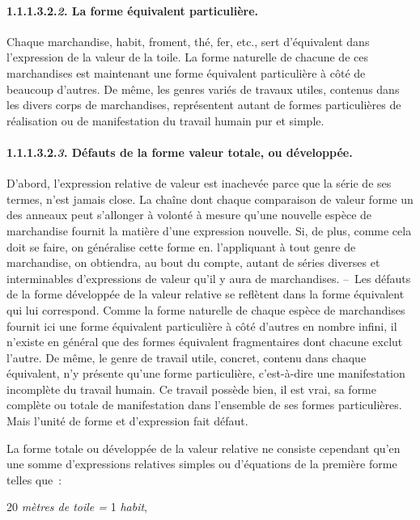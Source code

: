 \documentclass[french,twoside]{book} %
\begin{document}
\paragraph[{1.1.1.3.2.2. La forme équivalent particulière.}]{1.1.1.3.2.\emph{2}. La forme équivalent particulière.}
\noindent Chaque marchandise, habit, froment, thé, fer, etc., sert d’équivalent dans l’expression de la valeur de la toile. La forme naturelle de chacune de ces marchandises est maintenant une forme équivalent particulière à côté de beaucoup d’autres. De même, les genres variés de travaux utiles, contenus dans les divers corps de marchandises, représentent autant de formes particulières de réalisation ou de manifestation du travail humain pur et simple.
\paragraph[{1.1.1.3.2.3. Défauts de la forme valeur totale, ou développée.}]{1.1.1.3.2.\emph{3}. Défauts de la forme valeur totale, ou développée.}
\noindent D’abord, l’expression relative de valeur est inachevée parce que la série de ses termes, n’est jamais close. La chaîne dont chaque comparaison de valeur forme un des anneaux peut s’allonger à volonté à mesure qu’une nouvelle espèce de marchandise fournit la matière d’une expression nouvelle. Si, de plus, comme cela doit se faire, on généralise cette forme en. l’appliquant à tout genre de marchandise, on obtiendra, au bout du compte, autant de séries diverses et interminables d’expressions de valeur qu’il y aura de marchandises. – Les défauts de la forme développée de la valeur relative se reflètent dans la forme équivalent qui lui correspond. Comme la forme naturelle de chaque espèce de marchandises fournit ici une forme équivalent particulière à côté d’autres en nombre infini, il n’existe en général que des formes équivalent fragmentaires dont chacune exclut l’autre. De même, le genre de travail utile, concret, contenu dans chaque équivalent, n’y présente qu’une forme particulière, c’est-à-dire une manifestation incomplète du travail humain. Ce travail possède bien, il est vrai, sa forme complète ou totale de manifestation dans l’ensemble de ses formes particulières. Mais l’unité de forme et d’expression fait défaut.\par
La forme totale ou développée de la valeur relative ne consiste cependant qu’en une somme d’expressions relatives simples ou d’équations de la première forme telles que :\par
20\emph{ mètres de toile =} 1\emph{ habit},\par
\end{document}
